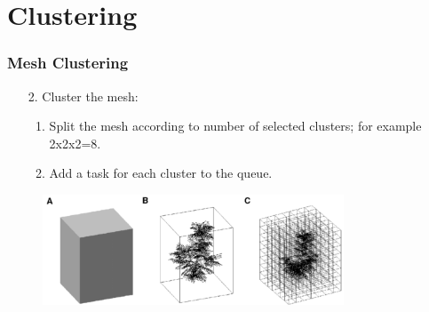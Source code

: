 \documentclass[
	10pt,
	t		%
]{beamer}
\begin{document}
\section{Clustering}
\begin{frame}
\frametitle{Mesh Clustering}
\begin{enumerate}
\item [2.] Cluster the mesh:
\begin{enumerate}
\item Split the mesh according to number of selected clusters; for example 2x2x2=8.
\item Add a task for each cluster to the queue.
\end{enumerate}
\end{enumerate}
\begin{figure}[ht]
\centering
\includegraphics[width=0.8\textwidth]{clustering}
\end{figure}
\end{frame}
\end{document}
